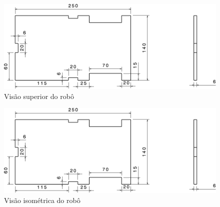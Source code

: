 \begin{figure}[htb]
  \caption{\label{fig:structure-up} Visão superior do robô}

  \begin{center}
    \includegraphics[scale=0.525,page=5]{../img/structure.pdf}
  \end{center}

\end{figure}

\begin{figure}[htb]
  \caption{\label{fig:structure-iso} Visão isométrica do robô}

  \begin{center}
    \includegraphics[scale=0.525,page=6]{../img/structure.pdf}
  \end{center}

\end{figure}
